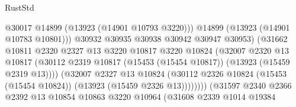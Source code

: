 \begin{lexlean}{RustStd}
\begin{coremodule}
                                              @30017
                                              @14899
                                              (@13923 (@14901 @10793 @3220)))
                                            @14899
                                            (@13923 (@14901 @10783 @10801)))
                                          @30932
                                          @30935
                                          @30938
                                          @30942
                                          @30947
                                          @30953)
                                        (@31662
                                          @10811
                                          @2320
                                          @2327
                                          @13
                                          @3220
                                          @10817
                                          @3220
                                          @10824
                                          (@32007
                                            @2320
                                            @13
                                            @10817
                                            (@30112
                                              @2319
                                              @10817
                                              (@15453 (@15454 @10817))
                                              (@13923 (@15459 @2319 @13))))
                                          (@32007
                                            @2327
                                            @13
                                            @10824
                                            (@30112
                                              @2326
                                              @10824
                                              (@15453 (@15454 @10824))
                                              (@13923 (@15459 @2326 @13))))))))
                                  (@31597
                                    @2340
                                    @2366
                                    @2392
                                    @13
                                    @10854
                                    @10863
                                    @3220
                                    @10964
                                    (@31608
                                      @2339
                                      @1014
                                      @19384

\end{coremodule}
\end{lexlean}
